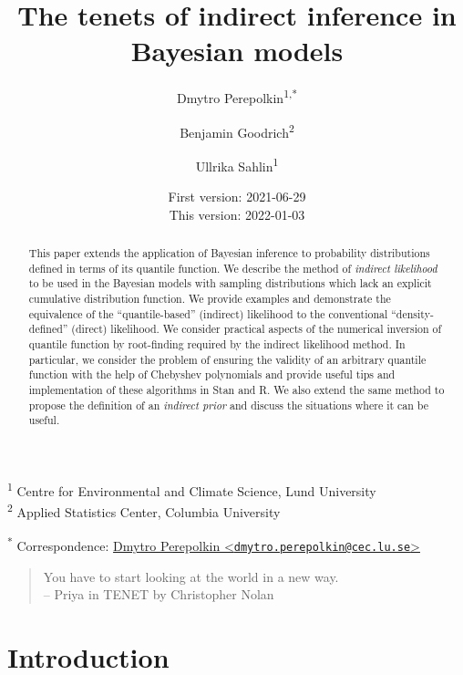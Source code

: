 \documentclass[
  12pt,
]{article}
\title{\vspace{1cm}The tenets of indirect inference in Bayesian models\vspace{0.5cm}}
\author{Dmytro Perepolkin\textsuperscript{1,*} \and Benjamin Goodrich\textsuperscript{2} \and Ullrika Sahlin\textsuperscript{1}}
\date{First version: 2021-06-29\\
This version: 2022-01-03}
\begin{document}
\maketitle
\begin{abstract}
\noindent{}
This paper extends the application of Bayesian inference to probability distributions defined in terms of its quantile function. We describe the method of \emph{indirect likelihood} to be used in the Bayesian models with sampling distributions which lack an explicit cumulative distribution function. We provide examples and demonstrate the equivalence of the ``quantile-based'' (indirect) likelihood to the conventional ``density-defined'' (direct) likelihood. We consider practical aspects of the numerical inversion of quantile function by root-finding required by the indirect likelihood method. In particular, we consider the problem of ensuring the validity of an arbitrary quantile function with the help of Chebyshev polynomials and provide useful tips and implementation of these algorithms in Stan and R. We also extend the same method to propose the definition of an \emph{indirect prior} and discuss the situations where it can be useful. \vspace{.8cm}
\end{abstract}

\textsuperscript{1} Centre for Environmental and Climate Science, Lund University\\
\textsuperscript{2} Applied Statistics Center, Columbia University

\textsuperscript{*} Correspondence: \href{mailto:dmytro.perepolkin@cec.lu.se}{Dmytro Perepolkin \textless{}\href{mailto:dmytro.perepolkin@cec.lu.se}{\nolinkurl{dmytro.perepolkin@cec.lu.se}}\textgreater{}}

\setcounter{tocdepth}{4}
\tableofcontents
\renewcommand{\[}{\begin{equation}}
\renewcommand{\]}{\end{equation}}

\begin {quotation}
You have to start looking at the world in a new way.\\ 
-- Priya in TENET by Christopher Nolan 
\end{quotation}

\hypertarget{introduction}{%
\section{Introduction}\label{introduction}}
\end{document}
